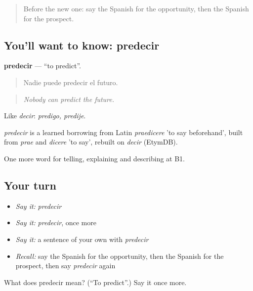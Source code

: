 \label{lesson:ES-C619-predecir}



\begin{quote}
Before the new one: say the Spanish for the opportunity, then the Spanish for the prospect.
\end{quote}

\subsection*{You'll want to know: predecir}
\textbf{predecir} — \textquotedblleft{}to predict\textquotedblright{}.

\begin{quote}
Nadie puede predecir el futuro.
\end{quote}

\begin{quote}
\emph{Nobody can predict the future.}
\end{quote}

Like \emph{decir}: \emph{predigo, predije}.

\begin{cousinweb}
\emph{predecir} is a learned borrowing from Latin \emph{praedicere} 'to say beforehand', built from \emph{prae} and \emph{dicere} 'to say', rebuilt on \emph{decir} (EtymDB).
\end{cousinweb}

\begin{grammarlens}[title={What you've built}]
One more word for telling, explaining and describing at B1.
\end{grammarlens}

\subsection*{Your turn}
\begin{itemize}
\raggedright
  \item \emph{Say it:} \emph{predecir}
  \item \emph{Say it:} \emph{predecir}, once more
  \item \emph{Say it:} a sentence of your own with \emph{predecir}
  \item \emph{Recall:} say the Spanish for the opportunity, then the Spanish for the prospect, then say \emph{predecir} again
\end{itemize}

\begin{tcolorbox}[breakable,colback=teal!4,colframe=teal!35!black,title={Before you move on}]
What does predecir mean? (\textquotedblleft{}To predict\textquotedblright{}.) Say it once more.
\end{tcolorbox}
